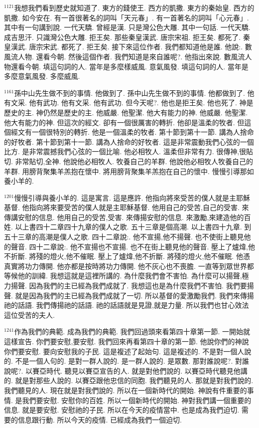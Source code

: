 \documentclass{book}
\begin{document}
$^{1121}$我想我們看到歷史就知道了.
東方的錢使王.
西方的凱撒.
東方的秦始皇.
西方的凱撒.
如今安在.
有一首很著名的詞叫「天元春」.
有一首著名的詞叫「心元春」.
其中有一句講到說.
一代天驕.
曾經是漢.
只是灣公色大雕.
其中一句話.
一代天驕.
成吉思汗.
只識灣公色大雕.
拒王矣.
那些秦皇漢武.
唐宗宋祖.
拒王矣.
都死了.
秦皇漢武.
唐宗宋武.
都死了.
拒王矣.
接下來這位作者.
我們都知道他是誰.
他說:.
數風流人物.
還看今朝.
然後這個作者.
我們知道是來自誰呢?.
他指出來說.
數風流人物還看今朝.
填這句詞的人.
當年是多麼樣威風.
意氣風發.
填這句詞的人.
當年是多麼意氣風發.
多麼威風.

$^{1161}$孫中山先生做不到的事情.
他做到了.
孫中山先生做不到的事情.
他都做到了.
他有文采.
他有武功.
他有文采.
他有武功.
但今天呢?.
他也是拒王矣.
他也死了.
神是歷史的主.
神仍然是歷史的主.
他威嚴.
他聖潔.
他大有能力的神.
他威嚴.
他聖潔.
他大有能力的神.
但這次的經文.
卻有一個很厲害的轉折.
他卻是溫柔的牧者.
但這個經文有一個很特別的轉折.
他是一個溫柔的牧者.
第十節到第十一節.
講為人捨命的好牧者.
第十節到第十一節.
講為人捨命的好牧者.
這是非常震動我們心弦的一個比方.
是非常震撼我們心弦的一個比喻.
他必相牧人.
溫柔但非常有力.
很傳神,很貼切.
非常貼切,全神.
他說他必相牧人.
牧養自己的羊群.
他說他必相牧人牧養自己的羊群.
用膀背聚集羊羔抱在懷中.
將用膀背聚集羊羔抱在自己的懷中.
慢慢引導那如養小羊的.

$^{1201}$慢慢引導與養小羊的.
這是寓言.
這是應許.
他指向將來受苦的僕人就是主耶穌基督.
他指向將來要受苦的僕人就是主耶穌基督.
他用自己的受苦,自己的受害.
來傳講安慰的信息.
他用自己的受苦,受害.
來傳揚安慰的信息.
來激勵,來建造他的百姓.
以上書四十二章四十九章的僕人之歌.
五十三章是個高潮.
以上書四十九章.
到五十三章的高潮是僕人之歌.
四十二章說:.
他不宣揚,他不揚聲.
也不使街上聽見他的聲音.
四十二章說:.
他不宣揚也不宣揚.
也不在街上聽見他的聲音.
壓上了爐煒,他不折斷.
將殘的燈火,他不催眠.
壓上了爐煒,他不折斷.
將殘的燈火,他不催眠.
他憑真實將功力傳開.
他亦都是按時將功力傳開.
他不灰心也不喪膽.
一直等到眾世界都等候他的訓緯.
我想這就是這裡所講的.
為什麼我們會不害怕.
為什麼可以揚聲,極力揚聲.
因為我們的主已經為我們成就了.
我想這也是為什麼我們不害怕.
我們要揚聲.
就是因為我們的主已經為我們成就了一切.
所以基督的愛激勵我們.
我們來傳揚祂的話語.
我們傳揚祂的話語.
祂的話語就是見證,就是力量.
所以我們也甘心效法這位受苦的夫人.

$^{1241}$作為我們的典範.
成為我們的典範.
我們回過頭來看第四十章第一節.
一開始就這樣宣告.
你們要安慰,要安慰.
我們回來再看第四十章的第一節.
他說你們的神說你們要安慰.
要向安慰我的子民.
這是複述了起始句.
這是複述的.
不是對一個人說的.
不是一個人句的.
是對一群人說的.
是一群人說的.
是眾數.
那對誰說呢?.
對誰說呢?.
以賽亞時代.
聽見以賽亞宣告的人.
就是對他們說的.
以賽亞時代聽見他講的.
就是對那些人說的.
以賽亞跟他忠信的同胞.
我們聽見的人.
那就是對我們說的.
我們聽見的人.
現在就是對我們說的.
所以在一個新時代的開始.
神說有件重要的事情.
是我們要安慰.
安慰你的百姓.
所以一個新時代的開始.
神對我們講一個重要的信息.
就是要安慰.
安慰祂的子民.
所以在今天的疫情當中.
也是成為我們迫切.
需要的信息跟行動.
所以今天的疫情.
已經成為我們一個迫切.
\end{document}
